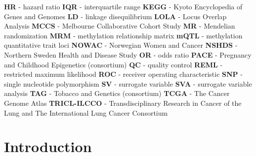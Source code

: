 \documentclass[11pt,twoside]{bristolthesis}
\begin{document}
\begin{abbreviations}
    \textbf{HR} - hazard ratio \newline
    \textbf{IQR} - interquartile range \newline
    \textbf{KEGG} - Kyoto Encyclopedia of Genes and Genomes \newline
    \textbf{LD} - linkage disequilibrium \newline
    \textbf{LOLA} - Locus Overlap Analysis \newline
    \textbf{MCCS} - Melbourne Collaborative Cohort Study \newline
    \textbf{MR} - Mendelian randomization \newline
    \textbf{MRM} - methylation relationship matrix \newline
    \textbf{mQTL} - methylation quantitative trait loci \newline
    \textbf{NOWAC} - Norwegian Women and Cancer \newline
    \textbf{NSHDS} - Northern Sweden Health and Disease Study \newline
    \textbf{OR} - odds ratio \newline
    \textbf{PACE} - Pregnancy and Childhood Epigenetics (consortium) \newline
    \textbf{QC} - quality control \newline
    \textbf{REML} - restricted maximum likelihood \newline
    \textbf{ROC} - receiver operating characteristic \newline
    \textbf{SNP} - single nucleotide polymorphism \newline
    \textbf{SV} - surrogate variable \newline
    \textbf{SVA} - surrogate variable analysis \newline
    \textbf{TAG} - Tobacco and Genetics (consortium) \newline
    \textbf{TCGA} - The Cancer Genome Atlas \newline
    \textbf{TRICL-ILCCO} - Transdisciplinary Research in Cancer of the Lung and The International Lung Cancer Consortium \newline
  \end{abbreviations}
\endgroup
{} %
\mainmatter %
\pagestyle{plain}
\hypertarget{introduction}{%
\chapter{Introduction}\label{introduction}}
\end{document}
